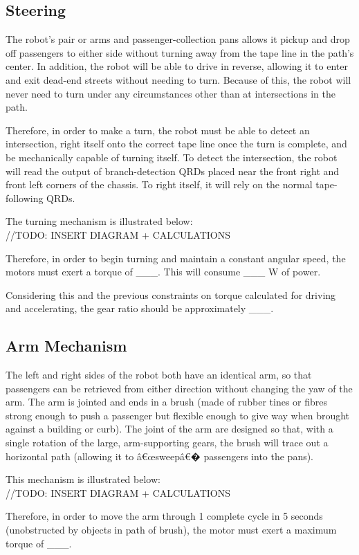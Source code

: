 \documentclass[12pt]{article}
\begin{document}
\subsection{Steering}
\par The robot's pair or arms and passenger-collection pans
allows it pickup and drop off passengers to either side without turning away
from the tape line in the path's center. In addition, the robot will be able to drive in reverse, allowing it to enter and exit dead-end streets without needing to turn. Because of this, the robot will never need to turn under any circumstances other than at intersections in the path. \\ \par Therefore, in order to make a turn, the robot must be able to detect an intersection, right itself onto the correct tape line once the turn is complete, and be mechanically capable of turning itself. To detect the intersection, the robot will read the output of branch-detection QRDs placed near the front right and front left corners of the chassis. To right itself, it will rely on the normal tape-following QRDs. \\ \par The turning mechanism is illustrated below: \\
//TODO: INSERT DIAGRAM + CALCULATIONS \\
\par Therefore, in order to begin turning and maintain a constant angular speed,  the motors must exert a torque of \_\_\_. This will consume \_\_\_ W of power. \\ \par 
Considering this and the previous constraints on torque calculated for driving and accelerating, the gear ratio should be approximately \_\_\_. \\
\subsection{Arm Mechanism}
\par The left and right sides of the robot both have an identical arm, so that passengers can be retrieved from either direction without changing the yaw of the arm. The arm is jointed and ends in a brush (made of rubber tines or fibres strong enough to push a passenger but flexible enough to give way when brought against a building or curb). The joint of the arm are designed so that, with a single rotation of the large, arm-supporting gears, the brush will trace out a horizontal path (allowing it to â€œsweepâ€� passengers into the pans). \\ \par 
\par This mechanism is illustrated below: \\
//TODO: INSERT DIAGRAM + CALCULATIONS \\
\par Therefore, in order to move the arm through 1 complete cycle in 5 seconds (unobstructed by objects in path of brush), the motor must exert a maximum torque of \_\_\_.
\end{document}
